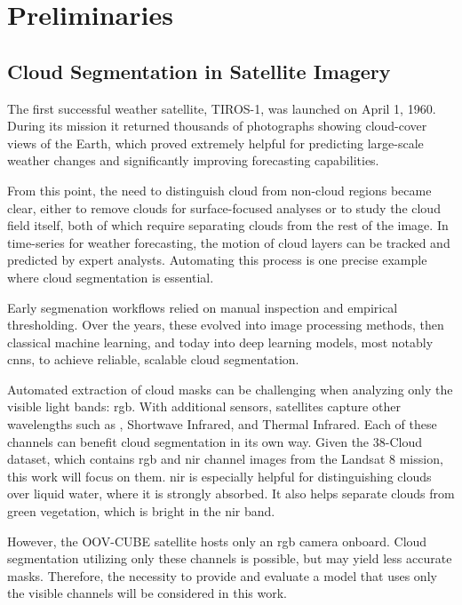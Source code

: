 {

\setlength{\parindent}{0pt}
\setlength{\parskip}{1em}

\chapter{Preliminaries}

\section{Cloud Segmentation in Satellite Imagery}

The first successful weather satellite, TIROS-1, was launched on April 1, 1960.
During its mission it returned thousands of photographs showing cloud-cover views of the Earth,
which proved extremely helpful for predicting large-scale weather changes and significantly improving forecasting capabilities.

From this point, the need to distinguish cloud from non-cloud regions became clear, either to remove clouds for
surface-focused analyses or to study the cloud field itself, both of which require separating clouds from the rest of the image.
In time-series for weather forecasting, the motion of cloud layers can be tracked and predicted by expert analysts.
Automating this process is one precise example where cloud segmentation is essential.

Early segmenation workflows relied on manual inspection and empirical thresholding.
Over the years, these evolved into image processing methods, then classical machine learning,
and today into deep learning models, most notably \glspl{cnn}, to achieve reliable, scalable cloud segmentation.

Automated extraction of cloud masks can be challenging when analyzing only the visible light bands: \gls{rgb}.
With additional sensors, satellites capture other wavelengths such as , Shortwave Infrared, and Thermal Infrared.
Each of these channels can benefit cloud segmentation in its own way.
Given the 38-Cloud dataset, which contains \gls{rgb} and \gls{nir} channel images from the Landsat 8 mission, this work will focus on them.
\gls{nir} is especially helpful for distinguishing clouds over liquid water, where it is strongly absorbed.
It also helps separate clouds from green vegetation, which is bright in the \gls{nir} band.

However, the OOV-CUBE satellite hosts only an \gls{rgb} camera onboard.
Cloud segmentation utilizing only these channels is possible, but may yield less accurate masks.
Therefore, the necessity to provide and evaluate a model that uses only the visible channels will be considered in this work.

}
